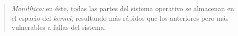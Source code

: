 \documentclass[a4paper,10pt,spanish]{article}
\begin{document}
\begin{enumerate}[1.]
\begin{quote}
\textit{Monilítico:} en éste, todas las partes del sistema operativo se almacenan en el espacio del \textit{kernel}, resultando más rápidos que los anteriores pero más vulnerables a fallas del sistema.
\end{quote}

\end{enumerate}
\end{document}
